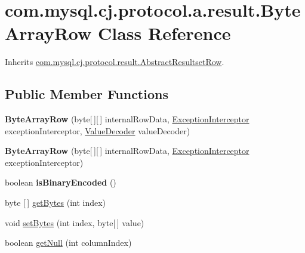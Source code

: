 \hypertarget{classcom_1_1mysql_1_1cj_1_1protocol_1_1a_1_1result_1_1_byte_array_row}{}\section{com.\+mysql.\+cj.\+protocol.\+a.\+result.\+Byte\+Array\+Row Class Reference}
\label{classcom_1_1mysql_1_1cj_1_1protocol_1_1a_1_1result_1_1_byte_array_row}


Inherits \mbox{\hyperlink{classcom_1_1mysql_1_1cj_1_1protocol_1_1result_1_1_abstract_resultset_row}{com.\+mysql.\+cj.\+protocol.\+result.\+Abstract\+Resultset\+Row}}.

\subsection*{Public Member Functions}
\begin{DoxyCompactItemize}
\item 
\mbox{\label{classcom_1_1mysql_1_1cj_1_1protocol_1_1a_1_1result_1_1_byte_array_row_ab3f796910db8e0489e63abd9a10e4d91}} 
{\bfseries Byte\+Array\+Row} (byte\mbox{[}$\,$\mbox{]}\mbox{[}$\,$\mbox{]} internal\+Row\+Data, \mbox{\hyperlink{interfacecom_1_1mysql_1_1cj_1_1exceptions_1_1_exception_interceptor}{Exception\+Interceptor}} exception\+Interceptor, \mbox{\hyperlink{interfacecom_1_1mysql_1_1cj_1_1protocol_1_1_value_decoder}{Value\+Decoder}} value\+Decoder)
\item 
\mbox{\label{classcom_1_1mysql_1_1cj_1_1protocol_1_1a_1_1result_1_1_byte_array_row_a883fd0a08c4efb53ce2fccbfa21f6c90}} 
{\bfseries Byte\+Array\+Row} (byte\mbox{[}$\,$\mbox{]}\mbox{[}$\,$\mbox{]} internal\+Row\+Data, \mbox{\hyperlink{interfacecom_1_1mysql_1_1cj_1_1exceptions_1_1_exception_interceptor}{Exception\+Interceptor}} exception\+Interceptor)
\item 
\mbox{\label{classcom_1_1mysql_1_1cj_1_1protocol_1_1a_1_1result_1_1_byte_array_row_a30e76b0cb27fb8a86ea186066605e756}} 
boolean {\bfseries is\+Binary\+Encoded} ()
\item 
byte \mbox{[}$\,$\mbox{]} \mbox{\hyperlink{classcom_1_1mysql_1_1cj_1_1protocol_1_1a_1_1result_1_1_byte_array_row_a51fcdd0efd6909d54dc395077c800768}{get\+Bytes}} (int index)
\item 
void \mbox{\hyperlink{classcom_1_1mysql_1_1cj_1_1protocol_1_1a_1_1result_1_1_byte_array_row_a2606ac2688da3531d2e72bfd51949632}{set\+Bytes}} (int index, byte\mbox{[}$\,$\mbox{]} value)
\item 
boolean \mbox{\hyperlink{classcom_1_1mysql_1_1cj_1_1protocol_1_1a_1_1result_1_1_byte_array_row_a53f7e5fef1221819ac7c48db6dc9ce94}{get\+Null}} (int column\+Index)
\end{DoxyCompactItemize}
